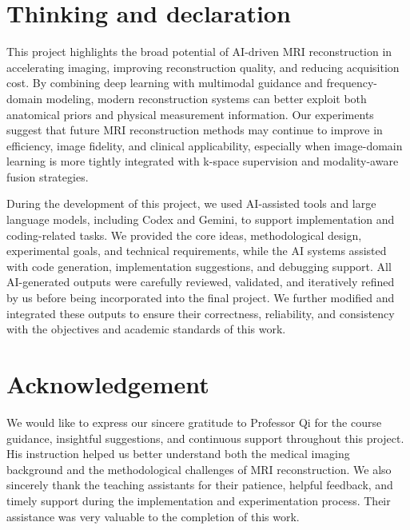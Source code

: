 \section{Thinking and declaration}
This project highlights the broad potential of AI-driven MRI reconstruction in accelerating imaging, improving reconstruction quality, and reducing acquisition cost. By combining deep learning with multimodal guidance and frequency-domain modeling, modern reconstruction systems can better exploit both anatomical priors and physical measurement information. Our experiments suggest that future MRI reconstruction methods may continue to improve in efficiency, image fidelity, and clinical applicability, especially when image-domain learning is more tightly integrated with k-space supervision and modality-aware fusion strategies.

During the development of this project, we used AI-assisted tools and large language models, including Codex and Gemini, to support implementation and coding-related tasks. We provided the core ideas, methodological design, experimental goals, and technical requirements, while the AI systems assisted with code generation, implementation suggestions, and debugging support. All AI-generated outputs were carefully reviewed, validated, and iteratively refined by us before being incorporated into the final project. We further modified and integrated these outputs to ensure their correctness, reliability, and consistency with the objectives and academic standards of this work.

\section{Acknowledgement}
We would like to express our sincere gratitude to Professor Qi for the course guidance, insightful suggestions, and continuous support throughout this project. His instruction helped us better understand both the medical imaging background and the methodological challenges of MRI reconstruction. We also sincerely thank the teaching assistants for their patience, helpful feedback, and timely support during the implementation and experimentation process. Their assistance was very valuable to the completion of this work.
